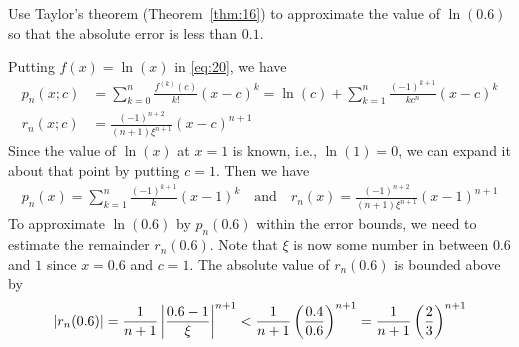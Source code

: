 \documentclass[thmcnt=section, 12pt]{my-elegantbook}
\begin{document}
\begin{exercise}
    Use Taylor's theorem (Theorem~\ref{thm:16}) to approximate the value of $\ln(0.6)$ so that the absolute error is less than $0.1$.
\end{exercise}

\begin{solution}
    Putting $f(x) = \ln(x)$ in \eqref{eq:20}, we have
    \begin{align*}
        p_n(x;c) & = \sum_{k=0}^{n} \frac{f^{(k)}(c)}{k!}(x-c)^k
        = \ln(c) + \sum_{k=1}^{n} \frac{(-1)^{k+1}}{k c^n}(x-c)^k  \\
        r_n(x;c) & = \frac{(-1)^{n+2}}{(n+1) \xi^{n+1}}(x-c)^{n+1}
    \end{align*}
    Since the value of $\ln(x)$ at $x=1$ is known, i.e., $\ln(1) = 0$, we can expand it about that point by putting $c=1$. Then we have
    \begin{align*}
        p_n(x) = \sum_{k=1}^{n} \frac{(-1)^{k+1}}{k}(x-1)^k
        \quad \text{and} \quad
        r_n(x) = \frac{(-1)^{n+2}}{(n+1) \xi^{n+1}}(x-1)^{n+1}
    \end{align*}
    To approximate $\ln(0.6)$ by $p_n(0.6)$ within the error bounds, we need to estimate the remainder $r_n(0.6)$. Note that $\xi$ is now some number in between $0.6$ and $1$ since $x=0.6$ and $c=1$. The absolute value of $r_n(0.6)$ is bounded above by
    \begin{align}
        \left\lvert r_n(0.6) \right\rvert = \frac{1}{n+1} \left\lvert \frac{0.6-1}{\xi} \right\rvert^{n+1}
        < \frac{1}{n+1} \left(\frac{0.4}{0.6}\right)^{n+1}
        = \frac{1}{n+1} \left(\frac{2}{3}\right)^{n+1}
        \label{eq:25}
    \end{align}



\end{solution}
\end{document}
